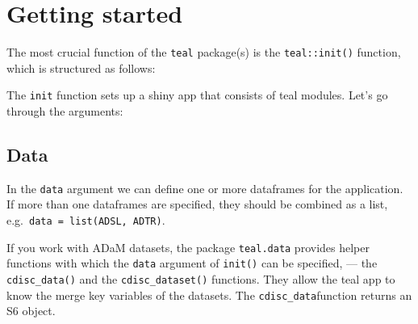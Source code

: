 \documentclass[
  letterpaper,
  DIV=11,
  numbers=noendperiod]{scrreprt}
\newenvironment{Shaded}{\begin{snugshade}}{\end{snugshade}}
\newcommand{\AttributeTok}[1]{\textcolor[rgb]{0.40,0.45,0.13}{#1}}
\newcommand{\ConstantTok}[1]{\textcolor[rgb]{0.56,0.35,0.01}{#1}}
\newcommand{\DecValTok}[1]{\textcolor[rgb]{0.68,0.00,0.00}{#1}}
\newcommand{\FunctionTok}[1]{\textcolor[rgb]{0.28,0.35,0.67}{#1}}
\newcommand{\NormalTok}[1]{\textcolor[rgb]{0.00,0.23,0.31}{#1}}
\newcommand{\SpecialCharTok}[1]{\textcolor[rgb]{0.37,0.37,0.37}{#1}}
\newcommand{\StringTok}[1]{\textcolor[rgb]{0.13,0.47,0.30}{#1}}
\begin{document}
\hypertarget{getting-started}{%
\section{Getting started}\label{getting-started}}

The most crucial function of the \texttt{teal} package(s) is the
\texttt{teal::init()} function, which is structured as follows:

\begin{Shaded}
\end{Shaded}

The \texttt{init} function sets up a shiny app that consists of teal
modules. Let's go through the arguments:

\hypertarget{data-1}{%
\subsection{Data}\label{data-1}}

In the \texttt{data} argument we can define one or more dataframes for
the application. If more than one dataframes are specified, they should
be combined as a list, e.g.~\texttt{data\ =\ list(ADSL,\ ADTR)}.

If you work with ADaM datasets, the package \texttt{teal.data} provides
helper functions with which the \texttt{data} argument of
\texttt{init()} can be specified, --- the \texttt{cdisc\_data()} and the
\texttt{cdisc\_dataset()} functions. They allow the teal app to know the
merge key variables of the datasets. The \texttt{cdisc\_data}function
returns an S6 object.
\end{document}
